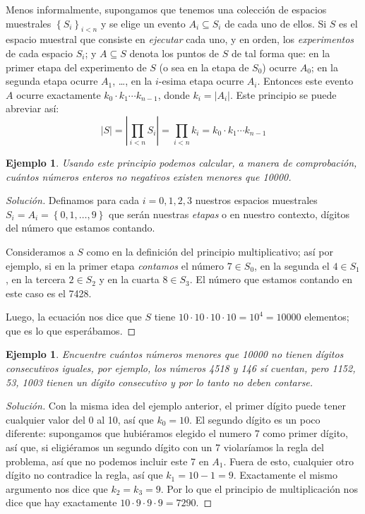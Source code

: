 \documentclass[spanish]{report}
\newtheorem{ejm}[thm]{Ejemplo}
\newcommand{\card}[1]{\left|#1 \right|}
\begin{document}
Menos informalmente, supongamos que tenemos una colección de espacios muestrales $\left\lbrace S_i \right\rbrace_{i<n}$ y se elige un evento $A_i \subseteq S_i$ de cada uno de ellos. 
Si $S$ es el espacio muestral que consiste en \emph{ejecutar} %
cada uno, y en orden, los \emph{experimentos} de cada espacio $S_i$; y $A \subseteq S$ denota los puntos de $S$ de tal forma que: en la primer etapa del experimento de $S$ (o sea en la etapa de $S_0$) ocurre $A_0$; en la segunda etapa ocurre $A_1$, \ldots, en la $i$-esima etapa ocurre $A_i$. Entonces este evento $A$ ocurre exactamente $k_0 \cdotp k_1 \cdots k_{n-1}$, donde $k_i= \card{A_i}$.
Este principio se puede abreviar así:
\begin{equation}\label{eq_PrincipioMultiplicativo}
	\card{S} = \card{\prod_{i<n} S_i} = \prod_{i<n}k_i = k_0 \cdotp k_1 \cdots k_{n-1}
\end{equation}

\begin{ejm}
	Usando este principio podemos calcular, a manera de comprobación, cuántos números enteros no negativos existen menores que 10000.
\end{ejm}
\begin{proof}[Solución]
Definamos para cada $i=0,1,2,3$ nuestros espacios muestrales $S_i = A_i= \left\lbrace 0,1, \ldots,9 \right\rbrace$ que serán nuestras \emph{etapas} o en nuestro contexto, dígitos del número que estamos contando. %

Consideramos a $S$ como en la definición del principio multiplicativo; así por ejemplo, si en la primer etapa \emph{contamos} el número $7 \in S_0$, en la segunda el $4 \in S_1$, en la tercera $2 \in S_2$ y en la cuarta $8 \in S_3$. El número que estamos contando en este caso es el 7428.

Luego, la ecuación nos dice que $S$ tiene $10 \cdotp 10\cdotp 10 \cdotp 10 = 10^4 = 10000$ elementos; que es lo que esperábamos.
\end{proof}
\begin{ejm}
	Encuentre cuántos números menores que 10000 no tienen dígitos consecutivos iguales, por ejemplo, los números 4518 y 146 sí cuentan, pero 1152, 53, 1003 tienen un dígito consecutivo y por lo tanto no deben contarse.
\end{ejm}
\begin{proof}[Solución]
	Con la misma idea del ejemplo anterior, el primer dígito puede tener cualquier valor del 0 al 10, así que $k_0 = 10$. El segundo dígito es un poco diferente: supongamos que hubiéramos elegido el numero 7 como primer dígito, así que, si eligiéramos un segundo dígito con un 7 violaríamos la regla del problema, así que no podemos incluir este 7 en $A_1$. Fuera de esto, cualquier otro dígito no contradice la regla, así que $k_1 = 10 - 1 = 9$. 
Exactamente el mismo argumento nos dice que $k_2 = k_3 = 9$.
Por lo que el principio de multiplicación nos dice que hay exactamente $10 \cdotp 9 \cdotp 9 \cdotp 9 = 7290$.
\end{proof}
\end{document}
